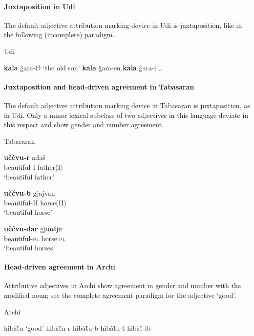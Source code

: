 \paragraph*{Juxtaposition in Udi}
The default adjective attribution marking device in Udi is juxtaposition, like in the following (incomplete) paradigm.
\begin{exe}
\settowidth{}
\ex 
{\rm Udi \citep[465]{schulze-furhoff1994}}
\begin{xlist}
\ex \textbf{kala} ĝara-Ø	{\rm ‘the old son’}	
\ex \textbf{kala} ĝara-en					
\ex \textbf{kala} ĝara-i					
\ex \dots
\end{xlist}
\end{exe}

\paragraph*{Juxtaposition and head\hyp{}driven agreement in Tabasaran}
The default adjective attribution marking device in Tabasaran is juxtaposition, as in Udi. Only a minor lexical subclass of two adjectives in this language deviate in this respect and show gender and number agreement.
\begin{exe}
\ex 
{\rm Tabasaran \citep[50–51]{kurbanov1986}}
\begin{xlist}
\ex 
\gll 	\textbf{uččvu-r} adaš\\
	beautiful-\textsc{I} father\textsc{(I)}\\
\glt	‘beautiful father’

\ex 
\gll	\textbf{uččvu-b} gjajvan\\
	beautiful-\textsc{II} horse\textsc{(II)}\\
\glt	‘beautiful horse’

\ex
\gll	\textbf{uččvu-dar} gjunšjir\\
	beautiful-\textsc{pl} horse:\textsc{pl}\\
\glt	‘beautiful horses’
\end{xlist}
\end{exe}

\paragraph*{Head\hyp{}driven agreement in Archi}
Attributive adjectives in Archi show agreement in gender and number with the modified noun; see the complete agreement paradigm for the adjective ‘good’.
\begin{exe}
\settowidth\jamwidth{[\textsc{IV sg}]}
\ex 
{\rm Archi \citep{kibrik1994a}}
\begin{xlist}
\ex	hibàt̄u	{\rm ‘good’}	\jambox{{\rm [\textsc{I sg}]}}
\ex	hibàt̄u-r				\jambox{{\rm [\textsc{II sg}]}}
\ex	hibàt̄u-b				
\ex	hibàt̄u-t				\jambox{{\rm [\textsc{IV sg}]}}
\ex	hibàt̄-ib				\jambox{{\rm [\textsc{pl}]}}
\end{xlist}
\end{exe}

